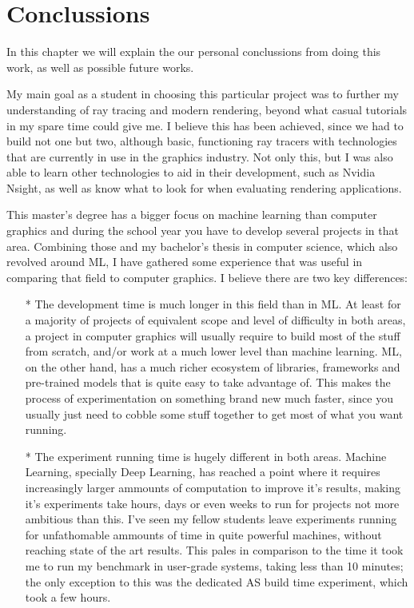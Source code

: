 \chapter{Conclussions}

In this chapter we will explain the our personal conclussions from doing this work, as well as possible future works.

My main goal as a student in choosing this particular project was to further my understanding of ray tracing and modern rendering, beyond what casual tutorials in my spare time could give me. I believe this has been achieved, since we had to build not one but two, although basic, functioning ray tracers with technologies that are currently in use in the graphics industry. Not only this, but I was also able to learn other technologies to aid in their development, such as Nvidia Nsight, as well as know what to look for when evaluating rendering applications.

This master's degree has a bigger focus on machine learning than computer graphics and during the school year you have to develop several projects in that area. Combining those and my bachelor's thesis in computer science, which also revolved around ML, I have gathered some experience that was useful in comparing that field to computer graphics. I believe there are two key differences:

\begin{itemize}
  \item[*]{The development time is much longer in this field than in ML. At least for a majority of projects of equivalent scope and level of difficulty in both areas, a project in computer graphics will usually require to build most of the stuff from scratch, and/or work at a much lower level than machine learning. ML, on the other hand, has a much richer ecosystem of libraries, frameworks and pre-trained models that is quite easy to take advantage of. This makes the process of experimentation on something brand new much faster, since you usually just need to cobble some stuff together to get most of what you want running.}
  \item[*]{The experiment running time is hugely different in both areas. Machine Learning, specially Deep Learning, has reached a point where it requires increasingly larger ammounts of computation to improve it's results, making it's experiments take hours, days or even weeks to run for projects not more ambitious than this. I've seen my fellow students leave experiments running for unfathomable ammounts of time in quite powerful machines, without reaching state of the art results. This pales in comparison to the time it took me to run my benchmark in user-grade systems, taking less than 10 minutes; the only exception to this was the dedicated AS build time experiment, which took a few hours.}
\end{itemize}

